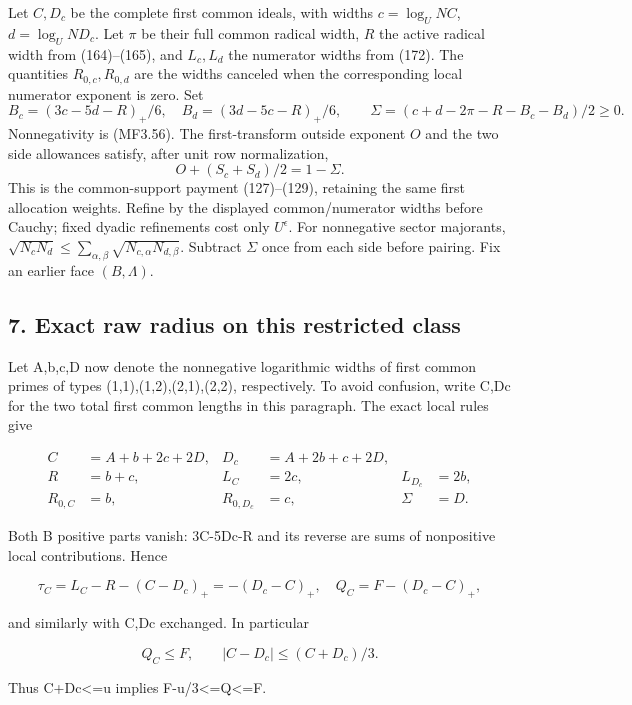 Let \(C,D_c\) be the complete first common ideals, with widths \(c=\log_U NC\), \(d=\log_U ND_c\). Let \(\pi\) be their full common radical width, \(R\) the active radical width from (164)--(165), and \(L_c,L_d\) the numerator widths from (172). The quantities \(R_{0,c},R_{0,d}\) are the widths canceled when the corresponding local numerator exponent is zero. Set \[
 B_c=(3c-5d-R)_+/6,\quad B_d=(3d-5c-R)_+/6,\qquad
 \Sigma=(c+d-2\pi-R-B_c-B_d)/2\ge0.
 \tag{RC1}
\] Nonnegativity is (MF3.56). The first-transform outside exponent \(O\) and the two side allowances satisfy, after unit row normalization, \[
 O+(S_c+S_d)/2=1-\Sigma.\tag{RC2}
\] This is the common-support payment (127)--(129), retaining the same first allocation weights. Refine by the displayed common/numerator widths before Cauchy; fixed dyadic refinements cost only \(U^\epsilon\). For nonnegative sector majorants, \(\sqrt{N_cN_d}\le\sum_{\alpha,\beta} \sqrt{N_{c,\alpha}N_{d,\beta}}\). Subtract \(\Sigma\) once from each side before pairing. Fix an earlier face \((B,\Lambda)\). 

\subsection{7. Exact raw radius on this restricted class}

Let A,b,c,D now denote the nonnegative logarithmic widths of first common primes of types (1,1),(1,2),(2,1),(2,2), respectively. To avoid confusion, write C,Dc for the two total first common lengths in this paragraph. The exact local rules give

\[
 \begin{aligned}
 C&=A+b+2c+2D,&D_c&=A+2b+c+2D,\\
 R&=b+c,&L_C&=2c,&L_{D_c}&=2b,\\
 R_{0,C}&=b,&R_{0,D_c}&=c,&\Sigma&=D.
 \end{aligned}                                                    \tag{12}
\]

Both B positive parts vanish: 3C-5Dc-R and its reverse are sums of nonpositive local contributions. Hence

\[
 \tau_C=L_C-R-(C-D_c)_+=-(D_c-C)_+,
 \quad Q_C=F-(D_c-C)_+,                                          \tag{13}
\]

and similarly with C,Dc exchanged. In particular

\[
 Q_C\le F,\qquad
 |C-D_c|\le(C+D_c)/3.                                            \tag{14}
\]

Thus C+Dc\textless=u implies F-u/3\textless=Q\textless=F.

